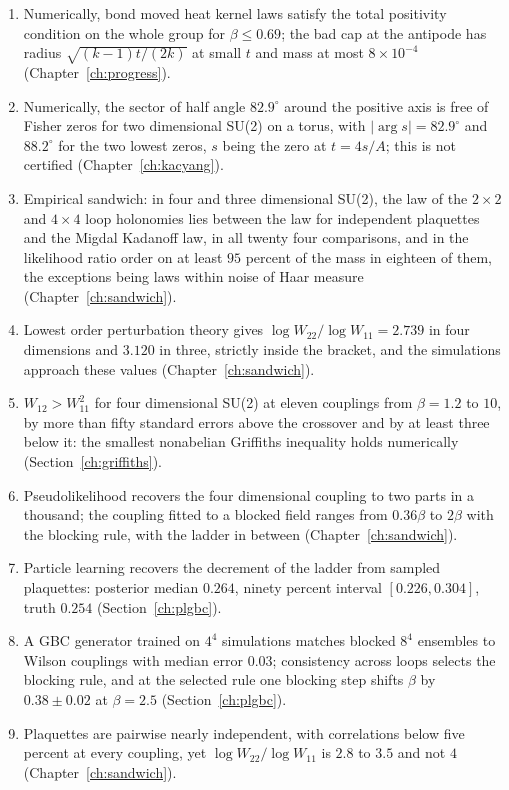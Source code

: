 \begin{enumerate}
\item Numerically, bond moved heat kernel laws satisfy the total positivity condition on the whole group for $\beta\le0.69$; the bad cap at the antipode has radius $\sqrt{(k-1)t/(2k)}$ at small $t$ and mass at most $8\times10^{-4}$ (Chapter~\ref{ch:progress}).
\item Numerically, the sector of half angle $82.9^\circ$ around the positive axis is free of Fisher zeros for two dimensional SU(2) on a torus, with $|\arg s|=82.9^\circ$ and $88.2^\circ$ for the two lowest zeros, $s$ being the zero at $t=4s/A$; this is not certified (Chapter~\ref{ch:kacyang}).
\item Empirical sandwich: in four and three dimensional SU(2), the law of the $2\times2$ and $4\times4$ loop holonomies lies between the law for independent plaquettes and the Migdal Kadanoff law, in all twenty four comparisons, and in the likelihood ratio order on at least $95$ percent of the mass in eighteen of them, the exceptions being laws within noise of Haar measure (Chapter~\ref{ch:sandwich}).
\item Lowest order perturbation theory gives $\log W_{22}/\log W_{11}=2.739$ in four dimensions and $3.120$ in three, strictly inside the bracket, and the simulations approach these values (Chapter~\ref{ch:sandwich}).
\item $W_{12}>W_{11}^2$ for four dimensional SU(2) at eleven couplings from $\beta=1.2$ to $10$, by more than fifty standard errors above the crossover and by at least three below it: the smallest nonabelian Griffiths inequality holds numerically (Section~\ref{ch:griffiths}).
\item Pseudolikelihood recovers the four dimensional coupling to two parts in a thousand; the coupling fitted to a blocked field ranges from $0.36\beta$ to $2\beta$ with the blocking rule, with the ladder in between (Chapter~\ref{ch:sandwich}).
\item Particle learning recovers the decrement of the ladder from sampled plaquettes: posterior median $0.264$, ninety percent interval $[0.226,0.304]$, truth $0.254$ (Section~\ref{ch:plgbc}).
\item A GBC generator trained on $4^4$ simulations matches blocked $8^4$ ensembles to Wilson couplings with median error $0.03$; consistency across loops selects the blocking rule, and at the selected rule one blocking step shifts $\beta$ by $0.38\pm0.02$ at $\beta=2.5$ (Section~\ref{ch:plgbc}).
\item Plaquettes are pairwise nearly independent, with correlations below five percent at every coupling, yet $\log W_{22}/\log W_{11}$ is $2.8$ to $3.5$ and not $4$ (Chapter~\ref{ch:sandwich}).

\end{enumerate}
